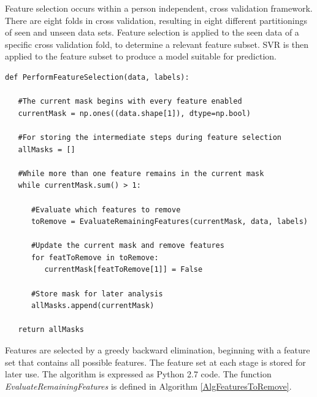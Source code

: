 Feature selection occurs within a person independent, cross validation framework. There are eight folds in cross validation, resulting in eight different partitionings of seen and unseen data sets. Feature selection is applied to the seen data of a specific cross validation fold, to determine a relevant feature subset. \ac{SVR} is then applied to the feature subset to produce a model suitable for prediction.


\begin{algorithm}
\scriptsize 
\lstset{language=Python}
\begin{lstlisting}[frame=single]
def PerformFeatureSelection(data, labels):

   #The current mask begins with every feature enabled
   currentMask = np.ones((data.shape[1]), dtype=np.bool)

   #For storing the intermediate steps during feature selection
   allMasks = []

   #While more than one feature remains in the current mask
   while currentMask.sum() > 1:

      #Evaluate which features to remove
      toRemove = EvaluateRemainingFeatures(currentMask, data, labels)

      #Update the current mask and remove features
      for featToRemove in toRemove:
         currentMask[featToRemove[1]] = False

      #Store mask for later analysis
      allMasks.append(currentMask)

   return allMasks
\end{lstlisting}
\normalsize
\caption{Features are selected by a greedy backward elimination, beginning with a feature set that contains all possible features. The feature set at each stage is stored for later use. The algorithm is expressed as Python 2.7 code. The function \textit{EvaluateRemainingFeatures} is defined in Algorithm \ref{AlgFeaturesToRemove}.}
\label{AlgFeatureSelectOverview}
\end{algorithm}

